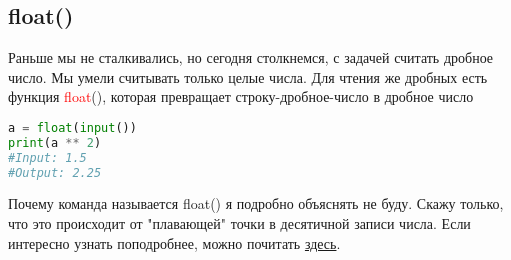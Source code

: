 \documentclass[12pt]{article} %
\begin{document}
\subsection{float()}
Раньше мы не сталкивались, но сегодня столкнемся, с задачей считать дробное число. Мы умели считывать только целые числа. Для чтения же дробных есть функция \textcolor{red}{float}(), которая превращает строку-дробное-число в дробное число
\begin{lstlisting}[language=Python]
a = float(input())
print(a ** 2)
#Input: 1.5
#Output: 2.25
\end{lstlisting}
Почему команда называется float() я подробно объяснять не буду. Скажу только, что это происходит от "плавающей" точки в десятичной записи числа. Если интересно узнать поподробнее, можно почитать \href{https://habr.com/ru/post/112953/}{здесь}.
\end{document}
